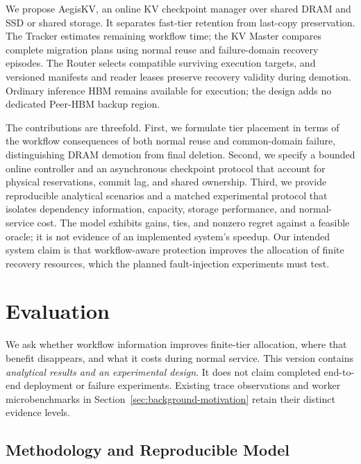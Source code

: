 \documentclass[sigplan,10pt,anonymous,nonacm]{acmart}
\begin{document}
We propose AegisKV, an online KV checkpoint manager over shared DRAM and
SSD or shared storage. It separates fast-tier retention from last-copy
preservation. The Tracker estimates remaining workflow time; the KV Master
compares complete migration plans using normal reuse and failure-domain
recovery episodes. The Router selects compatible surviving execution
targets, and versioned manifests and reader leases preserve recovery
validity during demotion. Ordinary inference HBM remains available for
execution; the design adds no dedicated Peer-HBM backup region.

The contributions are threefold. First, we formulate tier placement in
terms of the workflow consequences of both normal reuse and common-domain
failure, distinguishing DRAM demotion from final deletion. Second, we
specify a bounded online controller and an asynchronous checkpoint protocol
that account for physical reservations, commit lag, and shared ownership.
Third, we provide reproducible analytical scenarios and a matched
experimental protocol that isolates dependency information, capacity,
storage performance, and normal-service cost. The model exhibits gains,
ties, and nonzero regret against a feasible oracle; it is not evidence of
an implemented system's speedup. Our intended system claim is that
workflow-aware protection improves the allocation of finite recovery
resources, which the planned fault-injection experiments must test.




\section{Evaluation}
\label{sec:evaluation}

We ask whether workflow information improves finite-tier allocation,
where that benefit disappears, and what it costs during normal service.
This version contains \emph{analytical results and an experimental design}.
It does not claim completed end-to-end deployment or failure experiments.
Existing trace observations and worker microbenchmarks in
Section~\ref{sec:background-motivation} retain their distinct evidence levels.

\subsection{Methodology and Reproducible Model}
\label{sec:eval-method}
\end{document}

